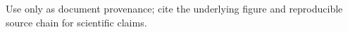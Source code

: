 Use only as document provenance; cite the underlying figure and reproducible source chain for scientific claims.
